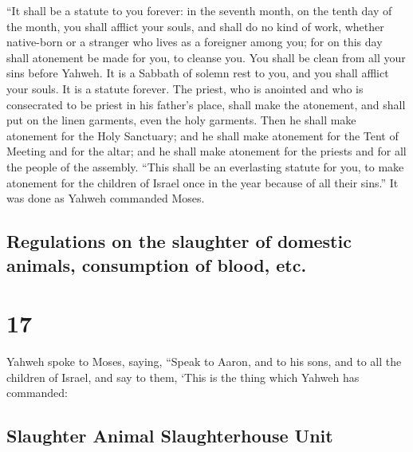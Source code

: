  ``It shall be a statute to you forever: in the seventh
month, on the tenth day of the month, you shall afflict your souls, and
shall do no kind of work, whether native-born or a stranger who lives as
a foreigner among you;  for on this day shall atonement
be made for you, to cleanse you. You shall be clean from all your sins
before Yahweh.  It is a Sabbath of solemn rest to you,
and you shall afflict your souls. It is a statute forever.
 The priest, who is anointed and who is consecrated to be
priest in his father's place, shall make the atonement, and shall put on
the linen garments, even the holy garments.  Then he
shall make atonement for the Holy Sanctuary; and he shall make atonement
for the Tent of Meeting and for the altar; and he shall make atonement
for the priests and for all the people of the assembly. 
``This shall be an everlasting statute for you, to make atonement for
the children of Israel once in the year because of all their sins.'' It
was done as Yahweh commanded Moses.

\hypertarget{regulations-on-the-slaughter-of-domestic-animals-consumption-of-blood-etc.}{%
\subsection{Regulations on the slaughter of domestic animals,
consumption of blood,
etc.}\label{regulations-on-the-slaughter-of-domestic-animals-consumption-of-blood-etc.}}

\hypertarget{section-16}{%
\section{17}\label{section-16}}

 Yahweh spoke to Moses, saying,  ``Speak to
Aaron, and to his sons, and to all the children of Israel, and say to
them, `This is the thing which Yahweh has commanded:

\hypertarget{slaughter-animal-slaughterhouse-unit}{%
\subsection{Slaughter Animal Slaughterhouse
Unit}\label{slaughter-animal-slaughterhouse-unit}}

